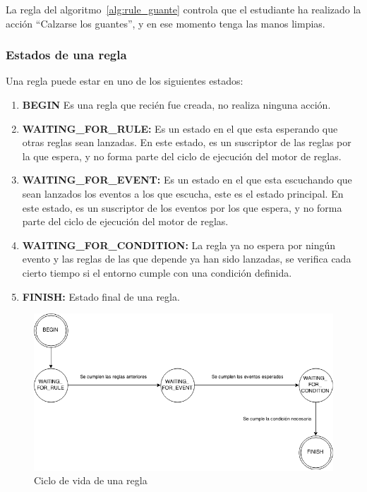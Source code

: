 La regla del algoritmo~\ref{alg:rule_guante} controla que el estudiante ha
realizado la acción \enquote{Calzarse los guantes}, y en ese momento tenga las
manos limpias.

\subsubsection{Estados de una regla}

Una regla puede estar en uno de los siguientes estados:

\begin{enumerate}
\item \textbf{BEGIN} Es una regla que recién fue creada, no realiza ninguna
	acción.
\item \textbf{WAITING\_FOR\_RULE:} Es un estado en el que esta esperando que otras reglas
	sean lanzadas. En este estado, es un suscriptor de las reglas por la que
	espera, y no forma parte del ciclo de ejecución del motor de reglas.
\item \textbf{WAITING\_FOR\_EVENT:} Es un estado en el que esta escuchando que sean
	lanzados los eventos a los que escucha, este es el estado principal. En
	este estado, es un suscriptor de los eventos por los que espera, y no
	forma parte del ciclo de ejecución del motor de reglas.
\item \textbf{WAITING\_FOR\_CONDITION:} La regla ya no espera por ningún evento y las
	reglas de las que depende ya han sido lanzadas, se verifica cada cierto
	tiempo si el entorno cumple con una condición definida. 
\item \textbf{FINISH:} Estado final de una regla.
\end{enumerate}

\begin{figure}
\centering
\includegraphics[width=12cm]{solucion/images/rules_flow.png}
\caption{Ciclo de vida de una regla}
\label{fig:rule_flow}
\end{figure}

